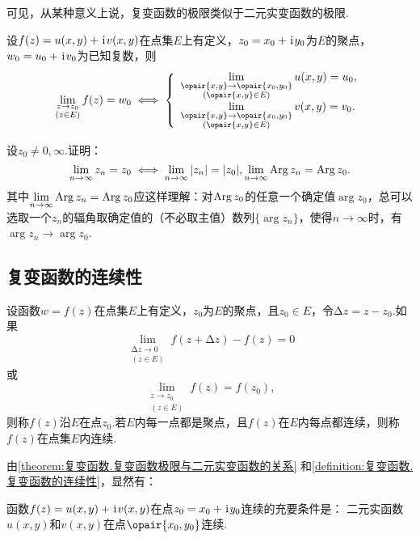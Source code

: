 可见，从某种意义上说，复变函数的极限类似于二元实变函数的极限.
\begin{theorem}\label{theorem:复变函数.复变函数极限与二元实变函数的关系}
设\(f(z)=u(x,y)+\kern1pt\mathrm{i}\kern1pt v(x,y)\)在点集\(E\)上有定义，\(z_0=x_0+\kern1pt\mathrm{i}\kern1pt y_0\)为\(E\)的聚点，\(w_0=u_0+\kern1pt\mathrm{i}\kern1pt v_0\)为已知复数，则\[
\lim\limits_{\substack{z \to z_0 \\ (z \in E)}} f(z) = w_0
\iff
\left\{ \begin{array}{l}
\lim\limits_{\substack{\opair{x,y}\to\opair{x_0,y_0} \\ (\opair{x,y} \in E)}} u(x,y) = u_0, \\
\lim\limits_{\substack{\opair{x,y}\to\opair{x_0,y_0} \\ (\opair{x,y} \in E)}} v(x,y) = v_0.
\end{array} \right.
\]
\end{theorem}

\begin{example}
设\(z_0\neq0,\infty\).证明：\[
\lim\limits_{n\to\infty} z_n = z_0
\iff
\lim\limits_{n\to\infty} \abs{z_n} = \abs{z_0},
\lim\limits_{n\to\infty} \operatorname{Arg} z_n = \operatorname{Arg} z_0.
\]其中\(\lim\limits_{n\to\infty} \operatorname{Arg} z_n = \operatorname{Arg} z_0\)应这样理解：对\(\operatorname{Arg} z_0\)的任意一个确定值\(\arg z_0\)，总可以选取一个\(z_n\)的辐角取确定值的（不必取主值）数列\(\{ \arg z_n \}\)，使得\(n\to\infty\)时，有\(\arg z_n \to \arg z_0\).
\end{example}

\subsection{复变函数的连续性}
\begin{definition}\label{definition:复变函数.复变函数的连续性}
设函数\(w=f(z)\)在点集\(E\)上有定义，\(z_0\)为\(E\)的聚点，且\(z_0 \in E\)，令\(\increment z = z - z_0\).如果\[
\lim\limits_{\substack{\increment z\to0 \\ (z \in E)}} f(z+\increment z) - f(z) = 0
\]或\[
\lim\limits_{\substack{z \to z_0 \\ (z \in E)}} f(z) = f(z_0),
\]则称\(f(z)\)沿\(E\)在点\(z_0\).若\(E\)内每一点都是聚点，且\(f(z)\)在\(E\)内每点都连续，则称\(f(z)\)在点集\(E\)内连续.
\end{definition}

由\cref{theorem:复变函数.复变函数极限与二元实变函数的关系} 和\cref{definition:复变函数.复变函数的连续性}，显然有：
\begin{theorem}
函数\(f(z)=u(x,y)+\kern1pt\mathrm{i}\kern1pt v(x,y)\)在点\(z_0=x_0+\kern1pt\mathrm{i}\kern1pt y_0\)连续的充要条件是：
二元实函数\(u(x,y)\)和\(v(x,y)\)在点\(\opair{x_0,y_0}\)连续.
\end{theorem}

